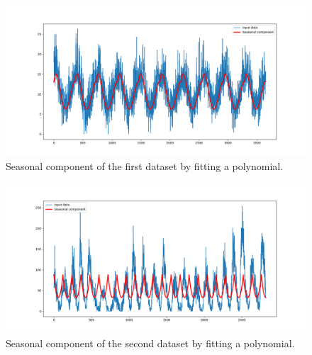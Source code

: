\documentclass[12pt]{article}
\begin{document}
\begin{enumerate}
\begin{figure}[H]
    \centering
    \begin{minipage}[b]{1\textwidth}
        \includegraphics[width=\textwidth]{figures/Ass1/Ass1_D1_fiting_polynomial.png}
    \end{minipage}
    \caption{Seasonal component of the first dataset by fitting a polynomial.}
    \label{fig:Ass1_D1_fiting_polynomial}
\end{figure}

\begin{figure}[H]
    \centering
    \begin{minipage}[b]{1\textwidth}
        \includegraphics[width=\textwidth]{figures/Ass1/Ass1_D2_fiting_polynomial.png}
    \end{minipage}
    \caption{Seasonal component of the second dataset by fitting a polynomial.}
    \label{fig:Ass1_D2_fiting_polynomial}
\end{figure}


\end{enumerate}
\end{document}
